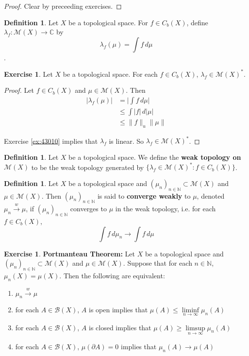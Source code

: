 \documentclass[12pt]{amsart}
\theoremstyle{definition}
\newtheorem{defn}[definition]{Definition}
\newtheorem{ex}[definition]{Exercise}
\newcommand{\lam}{\lambda}
\newcommand{\C}{\mathbb{C}}
\newcommand{\N}{\mathbb{N}}
\newcommand{\MB}{\mathcal{B}}
\newcommand{\MM}{\mathcal{M}}
\newcommand{\dmu}{\, d \mu}
\newcommand{\p}{\partial}
\newcommand{\limfn}{\liminf \limits_{n \rightarrow \infty}}
\newcommand{\limpn}{\limsup \limits_{n \rightarrow \infty}}
\newcommand{\conv}[1]{\xrightarrow{#1}}
\newcommand{\rex}[1]{Exercise \ref{ex:#1}}
\begin{document}
	\begin{proof}
		Clear by preceeding exercises.
	\end{proof}
	
	
	\begin{defn}
		Let $X$ be a topological space. For $f \in C_b(X)$, define $\lam_f: \MM(X) \rightarrow \C$ by $$\lam_f(\mu) = \int f \dmu$$.
	\end{defn}
	
	\begin{ex}
		Let $X$ be a topological space. For each $f \in C_b(X)$, $\lam_f \in \MM(X)^*$. 
	\end{ex}
	
	\begin{proof}
		Let $f \in C_b(X)$ and $\mu \in \MM(X)$. Then 
		\begin{align*}
			|\lam_f(\mu)| 
			&= \bigg | \int f \dmu \bigg| \\
			&\leq \int |f| \, d |\mu| \\
			& \leq \|f\|_u \|\mu\|
		\end{align*}
		
		\rex{43010} implies that $\lam_f$ is linear. So $\lam_f \in \MM(X)^*$.
	\end{proof}
	
	\begin{defn}
		Let $X$ be a topological space. We define the \textbf{weak topology on $\MM(X)$} to be the weak topology generated by $\{\lam_f \in \MM(X)^*: f \in C_b(X) \}$. 
	\end{defn}
	
	\begin{defn}
		Let $X$ be a topological space and $(\mu_{n})_{n \in \N} \subset \MM(X)$ and $\mu \in \MM(X)$. Then $(\mu_{n})_{n \in \N}$ is said to \textbf{converge  weakly} to $\mu$, denoted $\mu_n \conv{w} \mu$, if $(\mu_{n})_{n \in \N}$ converges to $\mu$ in the weak topology, i.e. for each $f \in C_b(X)$, $$\int f \dmu_n \rightarrow \int f \dmu$$ 
	\end{defn}	
	
	\begin{ex}\textbf{Portmanteau Theorem:}
		Let $X$ be a topological space and $(\mu_{n})_{n \in \N} \subset \MM(X)$ and $\mu \in \MM(X)$. Suppose that for each $n \in \N$, $\mu_n(X) = \mu(X)$. Then the following are equivalent:
		\begin{enumerate}
			\item $\mu_n \conv{w} \mu$
			\item for each $A \in \MB(X)$, $A$ is open implies that $\mu(A) \leq \limfn\limits \mu_n(A) $
			\item for each $A \in \MB(X)$, $A$ is closed implies that $\mu(A) \geq \limpn \limits \mu_n(A) $
			\item for each $A \in \MB(X)$, $\mu( \p A) = 0$ implies that $\mu_n(A) \rightarrow \mu(A) $
		\end{enumerate}
	\end{ex}
	
\end{document}
